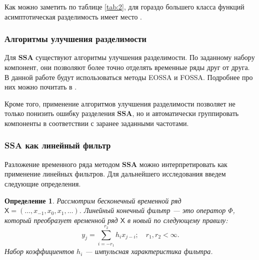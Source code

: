 \documentclass[a4paper, 11pt]{article}
\newcommand{\SSA}{\textbf{SSA}}
\newcommand{\TS}{\mathsf{X}}
\newtheorem{definition}{Определение} %
\begin{document}
Как можно заметить по таблице \ref{tab:2}, для гораздо большего класса функций асимптотическая разделимость имеет место \cite{golyandina2001analysis}.
\begin{table}[H]
	\begin{center}
		\caption{Асимптотическая разделимость}
		\label{tab:2}
	\end{center}
\end{table}

\subsubsection{Алгоритмы улучшения разделимости}
\label{sec:eossa_and_autogroup}
Для $\SSA$ существуют алгоритмы улучшения разделимости. По заданному набору компонент, они позволяют более точно отделять временные ряды друг от друга. В данной работе будут использоваться методы EOSSA и FOSSA. Подробнее про них можно почитать в \cite{golyandina2023intelligent}. 

Кроме того, применение алгоритмов улучшения разделимости позволяет не только понизить ошибку разделения $\SSA$, но и автоматически группировать компоненты в соответствии с заранее заданными частотами.

\subsubsection{SSA как линейный фильтр}
Разложение временного ряда методом $\SSA$ можно интерпретировать как применение линейных фильтров. Для дальнейшего исследования введем следующие определения.

\begin{definition}
	Рассмотрим бесконечный временной ряд $\TS = (\dots, x_{-1}, x_0, x_1, \dots)$. Линейный конечный фильтр --- это оператор $\Phi$, который преобразует временной ряд $\TS$ в новый по следующему правилу:
	\begin{equation*}
		y_j = \sum \limits_{i = -r_1}^{r_2} h_i x_{j-i}; \quad r_1, r_2 < \infty.
	\end{equation*}
	Набор коэффициентов ${h_i}$ --- импульсная характеристика фильтра.
\end{definition} 
\end{document}
